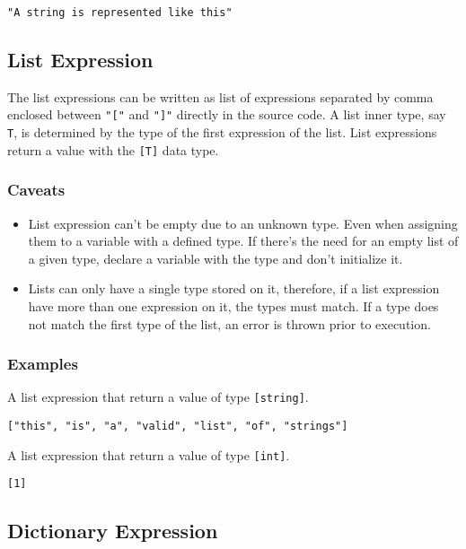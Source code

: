 \begin{lstlisting}
"A string is represented like this"
\end{lstlisting}

\subsection{List Expression}

The list expressions can be written as list of expressions separated by comma enclosed between \texttt{"["} and \texttt{"]"}
directly in the source code. A list inner type, say \texttt{T}, is determined by the type of the first expression of the list.
List expressions return a value with the \texttt{[T]} data type.

\subsubsection{Caveats}

\begin{itemize}
    \item List expression can't be empty due to an unknown type. Even when assigning them to a variable with a defined type. If there's the
        need for an empty list of a given type, declare a variable with the type and don't initialize it.
    \item Lists can only have a single type stored on it, therefore, if a list expression have more than one expression on it, the types
        must match. If a type does not match the first type of the list, an error is thrown prior to execution.
\end{itemize}

\subsubsection{Examples}

A list expression that return a value of type \texttt{[string]}.
\begin{lstlisting}
["this", "is", "a", "valid", "list", "of", "strings"]
\end{lstlisting}
A list expression that return a value of type \texttt{[int]}.
\begin{lstlisting}
[1]
\end{lstlisting}

\subsection{Dictionary Expression}

